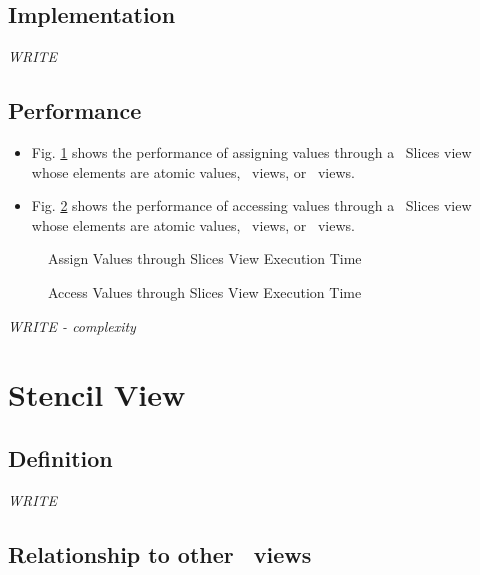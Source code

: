 \subsection{Implementation} \label{sec-slc-vw-impl}

\textit{WRITE}

\subsection{Performance} \label{sec-slc-vw-perf}

\begin{itemize}
\item
Fig. \ref{fig:slc-vw-assign-exper}
shows the performance of assigning values through a \stapl\ Slices view
whose elements are atomic values, \stl\ views, or \stapl\ views.
\item
Fig. \ref{fig:slc-vw-access-exper}
shows the performance of accessing values through a \stapl\ Slices view
whose elements are atomic values, \stl\ views, or \stapl\ views.
\end{itemize}

\begin{figure}[p]
\caption{Assign Values through Slices View Execution Time}
\label{fig:slc-vw-assign-exper}
\end{figure}

\begin{figure}[p]
\caption{Access Values through Slices View Execution Time}
\label{fig:slc-vw-access-exper}
\end{figure}

\emph{WRITE - complexity}


\section{Stencil View} \label{sec-stencil-vw}

\subsection{Definition}

\textit{WRITE}

\subsection{Relationship to other \stapl\ views}

